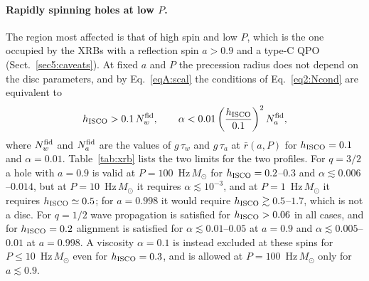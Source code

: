 \paragraph{Rapidly spinning holes at low $P$.}
The region most affected is that of high spin and low $P$, which is the one occupied by the XRBs with a reflection spin $a>0.9$ and a type-C QPO (Sect.~\ref{sec5:caveats}).
At fixed $a$ and $P$ the precession radius does not depend on the disc parameters, and by Eq.~\eqref{eqA:scal} the conditions of Eq.~\eqref{eq2:Ncond} are equivalent to
\begin{equation}
    \label{eqA:bounds}
    h_\textup{ISCO}>0.1\,N_w^\textup{fid},
    \qquad
    \alpha<0.01\left(\frac{h_\textup{ISCO}}{0.1}\right)^{2}N_a^\textup{fid},
\end{equation}
where $N_w^\textup{fid}$ and $N_a^\textup{fid}$ are the values of $g\,\tau_w$ and $g\,\tau_a$ at $\bar r(a,P)$ for $h_\textup{ISCO}=0.1$ and $\alpha=0.01$.
Table~\ref{tab:xrb} lists the two limits for the two profiles.
For $q=3/2$ a hole with $a=0.9$ is valid at $P=100$~Hz\,$M_\odot$ for $h_\textup{ISCO}=0.2$--$0.3$ and $\alpha\lesssim0.006$--$0.014$, but at $P=10$~Hz\,$M_\odot$ it requires $\alpha\lesssim10^{-3}$, and at $P=1$~Hz\,$M_\odot$ it requires $h_\textup{ISCO}\simeq0.5$; for $a=0.998$ it would require $h_\textup{ISCO}\gtrsim0.5$--$1.7$, which is not a disc.
For $q=1/2$ wave propagation is satisfied for $h_\textup{ISCO}>0.06$ in all cases, and for $h_\textup{ISCO}=0.2$ alignment is satisfied for $\alpha\lesssim0.01$--$0.05$ at $a=0.9$ and $\alpha\lesssim0.005$--$0.01$ at $a=0.998$.
A viscosity $\alpha=0.1$ is instead excluded at these spins for $P\leq10$~Hz\,$M_\odot$ even for $h_\textup{ISCO}=0.3$, and is allowed at $P=100$~Hz\,$M_\odot$ only for $a\lesssim0.9$.

